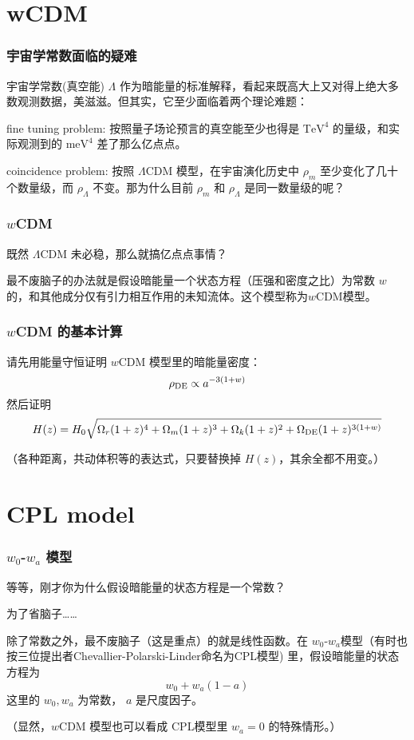 \documentclass[CJK,13pt]{beamer}
\date{}
\begin{document}
  \bch

  \section{wCDM}

  \begin{frame}
    \frametitle{宇宙学常数面临的疑难}
    宇宙学常数(真空能) $\Lambda$ 作为暗能量的标准解释，看起来既高大上又对得上绝大多数观测数据，美滋滋。但其实，它至少面临着两个理论难题：
    \bitem
  \item{{\blue fine tuning problem:} 按照量子场论预言的真空能至少也得是 $\mathrm{TeV}^4$ 的量级，和实际观测到的 $\mathrm{meV}^4$ 差了那么亿点点。}
  \item{{\blue coincidence problem:} 按照 $\Lambda$CDM 模型，在宇宙演化历史中 $\rho_m$ 至少变化了几十个数量级，而 $\rho_\Lambda$ 不变。那为什么目前 $\rho_m$ 和 $\rho_\Lambda$ 是同一数量级的呢？}
    \eitem
  \end{frame}

  \begin{frame}
    \frametitle{$w$CDM}
    既然 $\Lambda$CDM 未必稳，那么就搞亿点点事情？


    最不废脑子的办法就是假设暗能量一个状态方程（压强和密度之比）为常数 $w$ 的，和其他成分仅有引力相互作用的未知流体。这个模型称为{\blue $w$CDM模型}。
  \end{frame}

  \begin{frame}
    \frametitle{$w$CDM 的基本计算}
    请先用能量守恒证明 $w$CDM 模型里的暗能量密度：
    $$\rho_{\rm DE} \propto a^{-3(1+w)}$$
    然后证明
   {\small $$H(z)=H_0\sqrt{\Omega_r(1+z)^4+\Omega_m(1+z)^3 + \Omega_k(1+z)^2+\Omega_{\rm DE}(1+z)^{3(1+w)}}$$}

    \skiplines
    
    （各种距离，共动体积等的表达式，只要替换掉 $H(z)$，其余全都不用变。）
  \end{frame}

  \section{CPL model}
  
  \begin{frame}
    \frametitle{$w_0$-$w_a$ 模型}
    等等，刚才你为什么假设暗能量的状态方程是一个常数？
    
     为了省脑子……

    \skiplines
    
    除了常数之外，最不废脑子（这是重点）的就是线性函数。在 $w_0$-$w_a$模型（有时也按三位提出者Chevallier-Polarski-Linder命名为CPL模型) 里，假设暗能量的状态方程为
    $$w_0+w_a(1-a)$$
      这里的 $w_0, w_a$ 为常数， $a$ 是尺度因子。

      \skipline
      
      （显然，$w$CDM 模型也可以看成 CPL模型里 $w_a=0$ 的特殊情形。）
  \end{frame}
\end{document}
